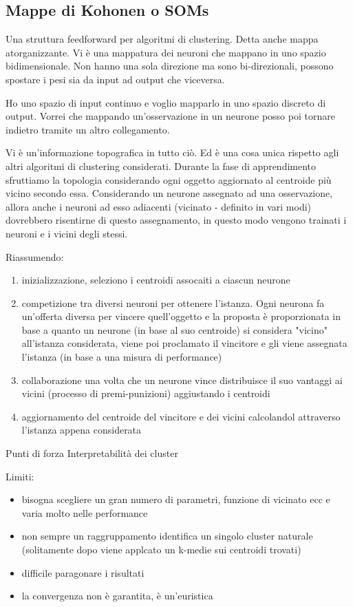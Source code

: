 \subsection{Mappe di Kohonen o SOMs}
Una struttura feedforward per algoritmi di clustering. Detta anche mappa atorganizzante. Vi \`e una mappatura dei neuroni che mappano in uno spazio bidimensionale. Non hanno una sola direzione ma sono bi-direzionali, possono spostare i pesi sia da input ad output che viceversa.

Ho uno spazio di input continuo e voglio mapparlo in uno spazio discreto di output. Vorrei che mappando un'osservazione in un neurone posso poi tornare indietro tramite un altro collegamento.

Vi \`e un'informazione topografica in tutto ci\`o. Ed \`e una cosa unica rispetto agli altri algoritmi di clustering considerati. Durante la fase di apprendimento sfruttiamo la topologia considerando ogni oggetto aggiornato al centroide pi\`u vicino secondo essa. Considerando un neurone assegnato ad una osservazione, allora anche i neuroni ad esso adiacenti (vicinato - definito in vari modi) dovrebbero risentirne di questo assegnamento, in questo modo vengono trainati i neuroni e i vicini degli stessi. 

Riassumendo:
\begin{enumerate}
	\item inizializzazione, seleziono i centroidi assocaiti a ciascun neurone
	\item competizione tra diversi neuroni per ottenere l'istanza. Ogni neurona fa un'offerta diversa per vincere quell'oggetto e la proposta \`e proporzionata in base a quanto un neurone (in base al suo centroide) si considera "vicino" all'istanza considerata, viene poi proclamato il vincitore e gli viene assegnata l'istanza (in base a una misura di performance)
	\item collaborazione una volta che un neurone vince distribuisce il suo vantaggi ai vicini (processo di premi-punizioni) aggiustando i centroidi
	\item aggiornamento del centroide del vincitore e dei vicini calcolandol attraverso l'istanza appena considerata
\end{enumerate} 

Punti di forza Interpretabilit\`a dei cluster 

Limiti:
\begin{itemize}
	\item bisogna scegliere un gran numero di parametri, funzione di vicinato ecc e varia molto nelle performance
	\item non sempre un raggruppamento identifica un singolo cluster naturale (solitamente dopo viene applcato un k-medie sui centroidi trovati)
	\item difficile paragonare i risultati
	\item la convergenza non \`e garantita, \`e un'euristica
\end{itemize}

